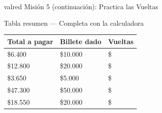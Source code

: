 \documentclass[12pt]{article}
\newcommand{\boxfill}[1][3cm]{%
  \tcbox[on line, size=minimal,
    colframe=valdark!60, colback=white,
    boxrule=1pt, arc=2mm,
    boxsep=4pt, left=3pt, right=3pt, top=3pt, bottom=3pt]%
  {\makebox[#1]{\vphantom{Mg}}}}
\begin{document}
\begin{mision}{valred}{\; Misión 5 (continuación): Practica las Vueltas}
\vspace{0.3cm}

\begin{actividad}{Tabla resumen --- Completa con la calculadora}
\renewcommand{\arraystretch}{1.9}
\begin{center}
\begin{tabular}{|m{4cm}|m{3.5cm}|m{3.5cm}|}
  \hline
  \rowcolor{valred!20}
  \textbf{Total a pagar} & \textbf{Billete dado} & \textbf{Vueltas} \\
  \hline
  \$6.400  & \$10.000 & \$ \boxfill[2.5cm] \\
  \hline
  \$12.800 & \$20.000 & \$ \boxfill[2.5cm] \\
  \hline
  \$3.650  & \$5.000  & \$ \boxfill[2.5cm] \\
  \hline
  \$47.300 & \$50.000 & \$ \boxfill[2.5cm] \\
  \hline
  \$18.550 & \$20.000 & \$ \boxfill[2.5cm] \\
  \hline
\end{tabular}
\end{center}
\end{actividad}

\end{mision}

\newpage
\end{document}
